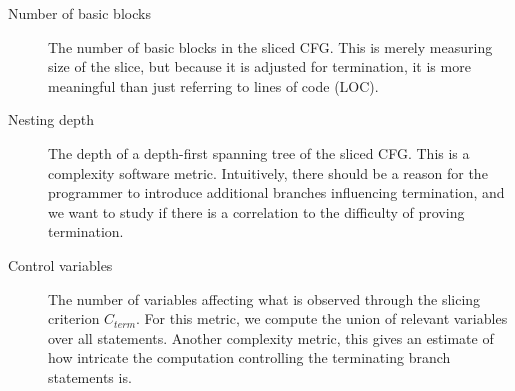 \begin{description}
    \item[Number of basic blocks] The number of basic blocks in the sliced CFG. This is merely measuring size of the slice, but because it is adjusted for termination, it is more meaningful than just referring to lines of code (LOC).
    \item[Nesting depth] The depth of a depth-first spanning tree of the sliced CFG. This is a complexity software metric. Intuitively, there should be a reason for the programmer to introduce additional branches influencing termination, and we want to study if there is a correlation to the difficulty of proving termination.
    \item[Control variables] The number of variables affecting what is observed through the slicing criterion $C_{term}$. For this metric, we compute the union of relevant variables over all statements. Another complexity metric, this gives an estimate of how intricate the computation controlling the terminating branch statements is.
\end{description}
